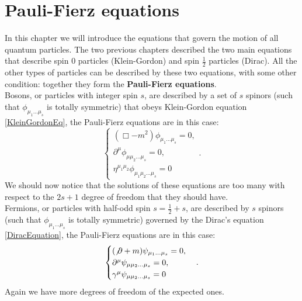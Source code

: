 \section{Pauli-Fierz equations}
In this chapter we will introduce the equations that govern the motion of all quantum particles. The two previous chapters described the two main equations that describe spin 0 particles (Klein-Gordon) and spin $\frac{1}{2}$ particles (Dirac). All the other types of particles can be described by these two equations, with some other condition: together they form the \textbf{Pauli-Fierz equations}.\\

Bosons, or particles with integer spin $s$, are described by a set of $s$ spinors (such that $\phi_{\mu_1\dots\mu_s}$ is totally symmetric) that obeys Klein-Gordon equation \eqref{KleinGordonEq}, the Pauli-Fierz equations are in this case:
\begin{equation}\label{BosonsPF}
    \begin{cases}
        (\Box -m^2)\phi_{\mu_1\dots\mu_s}=0,\\
        \partial^\mu\phi_{\mu\mu_2\dots\mu_s}=0,\\
        \eta^{\mu_1\mu_2}\phi_{\mu_1\mu_2\dots\mu_s}=0
    \end{cases}.
\end{equation}
We should now notice that the solutions of these equations are too many with respect to the $2s+1$ degree of freedom that they should have.\\

Fermions, or particles with half-odd spin $s=\frac{1}{2}+s$, are described by $s$ spinors (such that $\phi_{\mu_1\dots\mu_s}$ is totally symmetric) governed by the Dirac's equation \eqref{DiracEquation}, the Pauli-Fierz equations are in this case:
\begin{equation}\label{FermionsPF}
    \begin{cases}
        (\not\partial+m)\psi_{\mu_1\dots\mu_s}=0,\\
        \partial^\mu\psi_{\mu\mu_2\dots\mu_s}=0,\\
        \gamma^{\mu}\psi_{\mu\mu_2\dots\mu_s}=0
    \end{cases}.
\end{equation}
Again we have more degrees of freedom of the expected ones.
